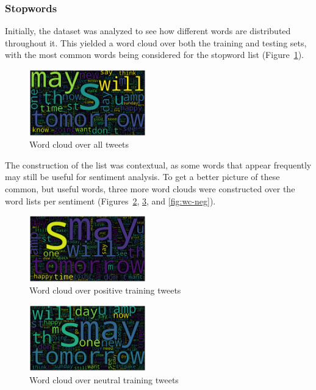 \documentclass[11pt]{article}
\begin{document}
\subsubsection{Stopwords}

Initially, the dataset was analyzed to see how different words are distributed throughout it.
This yielded a word cloud over both the training and testing sets, with the most common words being considered for the stopword list (Figure~\ref{fig:wc-all}).

\begin{figure}[!h]
	\centering
	\includegraphics[width = 0.45\textwidth]{wc/all-clean-default.png}
	\caption{Word cloud over all tweets}
	\label{fig:wc-all}
\end{figure} 

The construction of the list was contextual, as some words that appear frequently may still be useful for sentiment analysis.
To get a better picture of these common, but useful words, three more word clouds were constructed over the word lists per sentiment (Figures~\ref{fig:wc-pos}, \ref{fig:wc-neu}, and \ref{fig:wc-neg}).

\begin{figure}[!h]
	\centering
	\includegraphics[width = 0.45\textwidth]{wc/positive-clean-default.png}
	\caption{Word cloud over positive training tweets}
	\label{fig:wc-pos}
\end{figure} 

\begin{figure}[!h]
	\centering
	\includegraphics[width = 0.45\textwidth]{wc/neutral-clean-default.png}
	\caption{Word cloud over neutral training tweets}
	\label{fig:wc-neu}
\end{figure} 
\end{document}
